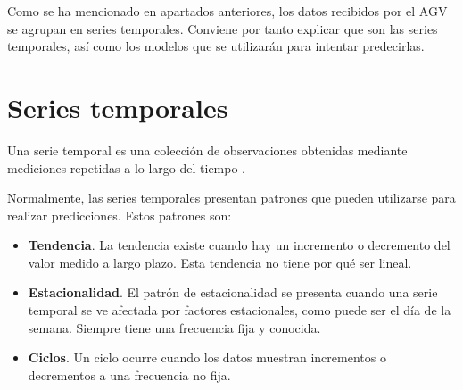 Como se ha mencionado en apartados anteriores, los datos recibidos por el AGV se agrupan en series temporales. Conviene por tanto explicar
que son las series temporales, así como los modelos que se utilizarán para intentar predecirlas.


\section{Series temporales}

Una serie temporal es una colección de observaciones obtenidas mediante mediciones repetidas a lo largo del tiempo \cite{influx:timeseries}.

Normalmente, las series temporales presentan patrones que pueden utilizarse para realizar predicciones. Estos patrones son:
\begin{itemize}
    \item \textbf{Tendencia}. La tendencia existe cuando hay un incremento o decremento del valor medido a largo plazo. Esta tendencia
        no tiene por qué ser lineal.
    \item \textbf{Estacionalidad}. El patrón de estacionalidad se presenta cuando una serie temporal se ve afectada por factores estacionales,
        como puede ser el día de la semana. Siempre tiene una frecuencia fija y conocida.
    \item \textbf{Ciclos}. Un ciclo ocurre cuando los datos muestran incrementos o decrementos a una frecuencia no fija.
\end{itemize}


